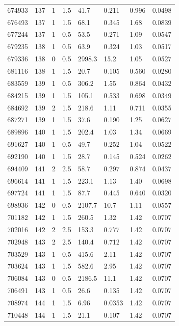 \documentclass[preview]{standalone}
\begin{document}
{{{{{{{{{{\begin{tabular}{L{1.2cm}C{1.2cm} C{0.3cm}C{0.5cm} C{1.4cm}C{1.4cm} C{1.4cm}C{1.4cm}}
  674933  &   137  & 1     & 1.5 &  41.7  & 0.211  & 0.996 &  0.0498   \\ 
  676493  &   137  & 1     & 1.5 &  68.1  & 0.345  & 1.68 &  0.0839   \\ 
  677244  &   137  & 1     & 0.5 &  53.5  & 0.271  & 1.09 &  0.0547   \\ 
  679235  &   138  & 1     & 0.5 &  63.9  & 0.324  & 1.03 &  0.0517   \\ 
  679336  &   138  & 0     & 0.5 &  2998.3  & 15.2  & 1.05 &  0.0527   \\ 
  681116  &   138  & 1     & 1.5 &  20.7  & 0.105  & 0.560 &  0.0280   \\ 
  683559  &   139  & 1     & 0.5 &  306.2  & 1.55  & 0.864 &  0.0432   \\ 
  684215  &   139  & 1     & 1.5 &  105.1  & 0.533  & 0.698 &  0.0349   \\ 
  684692  &   139  & 2     & 1.5 &  218.6  & 1.11  & 0.711 &  0.0355   \\ 
  687271  &   139  & 1     & 1.5 &  37.6  & 0.190  & 1.25 &  0.0627   \\ 
  689896  &   140  & 1     & 1.5 &  202.4  & 1.03  & 1.34 &  0.0669   \\ 
  691627  &   140  & 1     & 0.5 &  49.7  & 0.252  & 1.04 &  0.0522   \\ 
  692190  &   140  & 1     & 1.5 &  28.7  & 0.145  & 0.524 &  0.0262   \\ 
  694409  &   141  & 2     & 2.5 &  58.7  & 0.297  & 0.874 &  0.0437   \\ 
  696614  &   141  & 1     & 1.5 &  223.1  & 1.13  & 1.40 &  0.0698   \\ 
  697724  &   141  & 1     & 1.5 &  87.7  & 0.445  & 0.640 &  0.0320   \\ 
  698936  &   142  & 0     & 0.5 &  2107.7  & 10.7  & 1.11 &  0.0557   \\ 
  701182  &   142  & 1     & 1.5 &  260.5  & 1.32  & 1.42 &  0.0707   \\ 
  702016  &   142  & 2     & 2.5 &  153.3  & 0.777  & 1.42 &  0.0707   \\ 
  702948  &   143  & 2     & 2.5 &  140.4  & 0.712  & 1.42 &  0.0707   \\ 
  703529  &   143  & 1     & 0.5 &  415.6  & 2.11  & 1.42 &  0.0707   \\ 
  703624  &   143  & 1     & 1.5 &  582.6  & 2.95  & 1.42 &  0.0707   \\ 
  706084  &   143  & 0     & 0.5 &  2186.5  & 11.1  & 1.42 &  0.0707   \\ 
  706491  &   143  & 1     & 0.5 &  26.6  & 0.135  & 1.42 &  0.0707   \\ 
  708974  &   144  & 1     & 1.5 &  6.96  & 0.0353  & 1.42 &  0.0707   \\ 
  710448  &   144  & 1     & 1.5 &  21.1  & 0.107  & 1.42 &  0.0707   \\ 
\hline 
\end{tabular} 

}}}}}}}}}}
\end{document}
